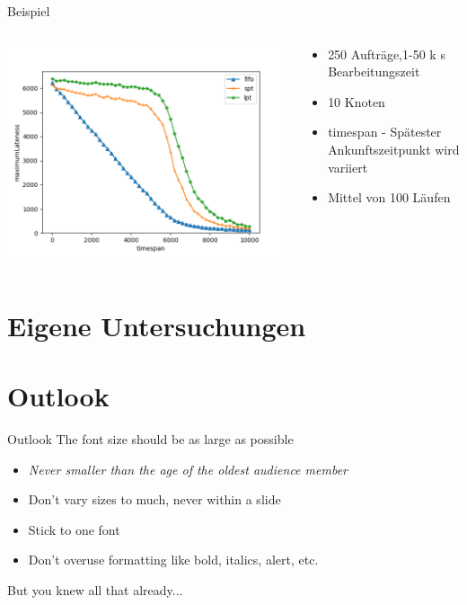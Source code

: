 \documentclass[aspectratio=169,10pt]{beamer}
\begin{document}
\begin{frame}[fragile]{Beispiel}

\begin{columns}
	\begin{column}{0.57\paperwidth}
		\vspace{0.5pt}
		\includegraphics[width=\linewidth, clip]{images/Figure_2_2}
	\end{column}
	\begin{column}[c]{0.43\paperwidth}
		\begin{itemize}
			\item 250 Auftr\"age,1-50 k s Bearbeitungszeit
			\item 10 Knoten
			\item timespan - Sp\"atester Ankunftszeitpunkt wird variiert
			\item Mittel von 100 L\"aufen
		\end{itemize}
	\end{column}
\end{columns}
\end{frame}

\section{Eigene Untersuchungen}

\section{Outlook}
\begin{frame}{Outlook}
\Large
The font size should be as large as possible
\begin{itemize}
\item \textit{Never smaller than the age of the oldest audience member}
\item Don't vary sizes to much, never within a slide
\item Stick to one font
\item Don't overuse formatting like bold, italics, alert, etc.
\end{itemize}
But you knew all that already...
\end{frame}
\end{document}
